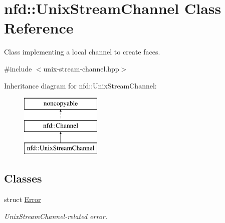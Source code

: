 \hypertarget{classnfd_1_1UnixStreamChannel}{}\section{nfd\+:\+:Unix\+Stream\+Channel Class Reference}
\label{classnfd_1_1UnixStreamChannel}


Class implementing a local channel to create faces.  




{\ttfamily \#include $<$unix-\/stream-\/channel.\+hpp$>$}

Inheritance diagram for nfd\+:\+:Unix\+Stream\+Channel\+:\begin{figure}[H]
\begin{center}
\leavevmode
\includegraphics[height=3.000000cm]{classnfd_1_1UnixStreamChannel}
\end{center}
\end{figure}
\subsection*{Classes}
\begin{DoxyCompactItemize}
\item 
struct \hyperlink{structnfd_1_1UnixStreamChannel_1_1Error}{Error}
\begin{DoxyCompactList}\small\item\em Unix\+Stream\+Channel-\/related error. \end{DoxyCompactList}\end{DoxyCompactItemize}
